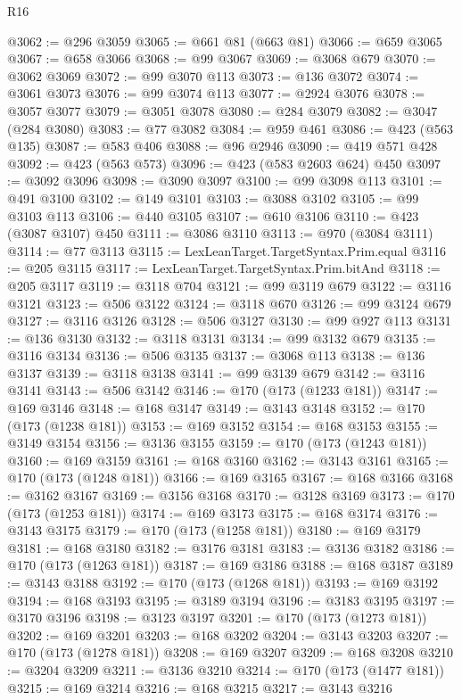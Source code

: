 \begin{lexlean}{R16}
\begin{coremodule}
@3062 := @296 @3059
@3065 := @661 @81 (@663 @81)
@3066 := @659 @3065
@3067 := @658 @3066
@3068 := @99 @3067
@3069 := @3068 @679
@3070 := @3062 @3069
@3072 := @99 @3070 @113
@3073 := @136 @3072
@3074 := @3061 @3073
@3076 := @99 @3074 @113
@3077 := @2924 @3076
@3078 := @3057 @3077
@3079 := @3051 @3078
@3080 := @284 @3079
@3082 := @3047 (@284 @3080)
@3083 := @77 @3082
@3084 := @959 @461
@3086 := @423 (@563 @135)
@3087 := @583 @406
@3088 := @96 @2946
@3090 := @419 @571 @428
@3092 := @423 (@563 @573)
@3096 := @423 (@583 @2603 @624) @450
@3097 := @3092 @3096
@3098 := @3090 @3097
@3100 := @99 @3098 @113
@3101 := @491 @3100
@3102 := @149 @3101
@3103 := @3088 @3102
@3105 := @99 @3103 @113
@3106 := @440 @3105
@3107 := @610 @3106
@3110 := @423 (@3087 @3107) @450
@3111 := @3086 @3110
@3113 := @970 (@3084 @3111)
@3114 := @77 @3113
@3115 := LexLeanTarget.TargetSyntax.Prim.equal
@3116 := @205 @3115
@3117 := LexLeanTarget.TargetSyntax.Prim.bitAnd
@3118 := @205 @3117
@3119 := @3118 @704
@3121 := @99 @3119 @679
@3122 := @3116 @3121
@3123 := @506 @3122
@3124 := @3118 @670
@3126 := @99 @3124 @679
@3127 := @3116 @3126
@3128 := @506 @3127
@3130 := @99 @927 @113
@3131 := @136 @3130
@3132 := @3118 @3131
@3134 := @99 @3132 @679
@3135 := @3116 @3134
@3136 := @506 @3135
@3137 := @3068 @113
@3138 := @136 @3137
@3139 := @3118 @3138
@3141 := @99 @3139 @679
@3142 := @3116 @3141
@3143 := @506 @3142
@3146 := @170 (@173 (@1233 @181))
@3147 := @169 @3146
@3148 := @168 @3147
@3149 := @3143 @3148
@3152 := @170 (@173 (@1238 @181))
@3153 := @169 @3152
@3154 := @168 @3153
@3155 := @3149 @3154
@3156 := @3136 @3155
@3159 := @170 (@173 (@1243 @181))
@3160 := @169 @3159
@3161 := @168 @3160
@3162 := @3143 @3161
@3165 := @170 (@173 (@1248 @181))
@3166 := @169 @3165
@3167 := @168 @3166
@3168 := @3162 @3167
@3169 := @3156 @3168
@3170 := @3128 @3169
@3173 := @170 (@173 (@1253 @181))
@3174 := @169 @3173
@3175 := @168 @3174
@3176 := @3143 @3175
@3179 := @170 (@173 (@1258 @181))
@3180 := @169 @3179
@3181 := @168 @3180
@3182 := @3176 @3181
@3183 := @3136 @3182
@3186 := @170 (@173 (@1263 @181))
@3187 := @169 @3186
@3188 := @168 @3187
@3189 := @3143 @3188
@3192 := @170 (@173 (@1268 @181))
@3193 := @169 @3192
@3194 := @168 @3193
@3195 := @3189 @3194
@3196 := @3183 @3195
@3197 := @3170 @3196
@3198 := @3123 @3197
@3201 := @170 (@173 (@1273 @181))
@3202 := @169 @3201
@3203 := @168 @3202
@3204 := @3143 @3203
@3207 := @170 (@173 (@1278 @181))
@3208 := @169 @3207
@3209 := @168 @3208
@3210 := @3204 @3209
@3211 := @3136 @3210
@3214 := @170 (@173 (@1477 @181))
@3215 := @169 @3214
@3216 := @168 @3215
@3217 := @3143 @3216

\end{coremodule}
\end{lexlean}
